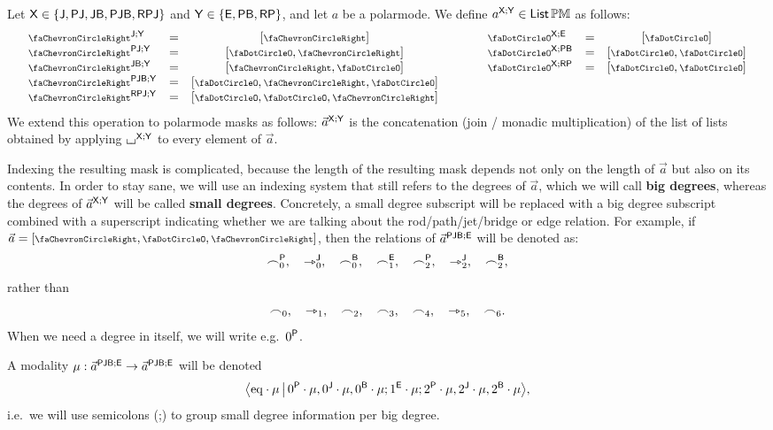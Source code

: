 \documentclass[a4paper]{memoir}
\begin{document}
\begin{definition} \label{def:pb}
	Let $\mathsf{X} \in \mathopen{}\left\{ \mathsf{J}, \mathsf{PJ}, \mathsf{JB}, \mathsf{PJB}, \mathsf{RPJ} \right\}\mathclose{}$ and $\mathsf{Y} \in \mathopen{}\left\{ \mathsf{E}, \mathsf{PB}, \mathsf{RP} \right\}\mathclose{}$, and let $a$ be a polarmode.
	We define $a^{\mathsf{X};\mathsf{Y}} \in {\mathsf{List}}\,{\mathbb{PM}}$ as follows:
	\[
		\begin{array}{l c c c l c c}
			\maskop \ypolar \maskj \mymasky &=& [\ypolar]
			&\qquad&
			\maskop \npolar \mymaskx \maske &=& [\npolar]
			\\
			\maskop \ypolar \maskpj \mymasky &=& [\npolar, \ypolar]
			&\qquad&
			\maskop \npolar \mymaskx \maskpb &=& [\npolar, \npolar]
			\\
			\maskop \ypolar \maskjb \mymasky &=& [\ypolar, \npolar]
			&\qquad&
			\maskop \npolar \mymaskx \maskrp &=& [\npolar, \npolar]
			\\
			\maskop \ypolar \maskpjb \mymasky &=& [\npolar, \ypolar, \npolar]
			\\
			\maskop \ypolar \maskrpj \mymasky &=& [\npolar, \npolar, \ypolar]
		\end{array}
	\]
	We extend this operation to polarmode masks as follows: $\vec a^{\mathsf{X};\mathsf{Y}}$ is the concatenation (join / monadic multiplication) of the list of lists obtained by applying ${\llcorner\hspace{-.4ex}\lrcorner}^{\mathsf{X};\mathsf{Y}}$ to every element of $\vec a$.
	
	Indexing the resulting mask is complicated, because the length of the resulting mask depends not only on the length of $\vec a$ but also on its contents.
	In order to stay sane, we will use an indexing system that still refers to the degrees of $\vec a$, which we will call \textbf{big degrees}, whereas the degrees of $\vec a^{\mathsf{X};\mathsf{Y}}$ will be called \textbf{small degrees}.
	Concretely, a small degree subscript will be replaced with a big degree subscript combined with a superscript indicating whether we are talking about the rod/path/jet/bridge or edge relation.
	For example, if $\vec a = [\ypolar, \npolar, \ypolar]$, then the relations of $\vec a^{\mathsf{PJB};\mathsf{E}}$ will be denoted as:
	\[
		\frown^{\mathsf{P}}_0, \quad
		\rightarrowtriangle^{\mathsf{J}}_0, \quad
		\frown^{\mathsf{B}}_0, \quad
		\frown^{\mathsf{E}}_1, \quad
		\frown^{\mathsf{P}}_2, \quad
		\rightarrowtriangle^{\mathsf{J}}_2, \quad
		\frown^{\mathsf{B}}_2,
	\]
	rather than
	\[
		\frown_0, \quad
		\rightarrowtriangle_1, \quad
		\frown_2, \quad
		\frown_3, \quad
		\frown_4, \quad
		\rightarrowtriangle_5, \quad
		{\frown_6}.
	\]
	When we need a degree in itself, we will write e.g.\ ${0}^{\mathsf{P}}$.
	
	A modality $\mu : \vec a^{\mathsf{PJB};\mathsf{E}} \to \vec a^{\mathsf{PJB};\mathsf{E}}$ will be denoted
	\[
		\mathopen{}\left\langle {\mathrm{eq}} \cdot \mu \,\middle|\, {0}^{\mathsf{P}} \cdot \mu, {0}^{\mathsf{J}} \cdot \mu, {0}^{\mathsf{B}} \cdot \mu ; {1}^{\mathsf{E}} \cdot \mu ; {2}^{\mathsf{P}} \cdot \mu, {2}^{\mathsf{J}} \cdot \mu, {2}^{\mathsf{B}} \cdot \mu \right\rangle\mathclose{},
	\]
	i.e.\ we will use semicolons (;) to group small degree information per big degree.
\end{definition}
\end{document}
